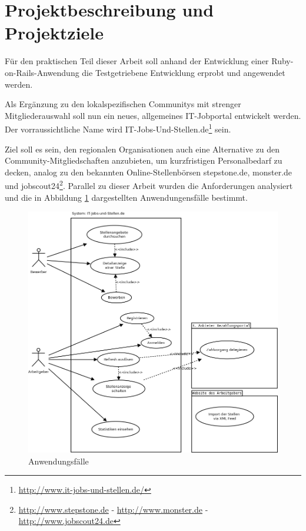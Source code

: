 \section{Projektbeschreibung und Projektziele}
Für den praktischen Teil dieser Arbeit soll anhand der Entwicklung einer Ruby-on-Rails\hyp{}Anwendung die Testgetriebene Entwicklung erprobt und angewendet werden.

Als Ergänzung zu den lokalspezifischen Communitys mit strenger Mitgliederauswahl soll nun ein neues, allgemeines IT-Jobportal entwickelt werden. Der vorraussichtliche Name wird IT-Jobs-Und-Stellen.de\footnote{\url{http://www.it-jobs-und-stellen.de/}} sein.

Ziel soll es sein, den regionalen Organisationen auch eine Alternative zu den Community-Mitgliedschaften anzubieten, um kurzfristigen Personalbedarf zu decken, analog zu den bekannten Online-Stellenbörsen stepstone.de, monster.de und jobscout24\footnote{\url{http://www.stepstone.de} - \url{http://www.monster.de} - \url{http://www.jobscout24.de}}. Parallel zu dieser Arbeit wurden die Anforderungen analysiert und die in Abbildung \ref{fig:usecases} dargestellten Anwendungensfälle bestimmt.


\begin{figure}[htbp]
 \centering
 \includegraphics[width=1\textwidth]{./material/usecases.png}
 \caption{Anwendungsfälle}
 \label{fig:usecases}
\end{figure}


